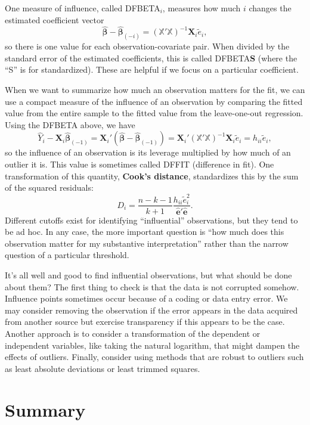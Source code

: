\documentclass[
  13pt,
  letterpaper,
  DIV=11,
  numbers=noendperiod]{scrreprt}
\newcommand{\mb}{\symbf}
\newcommand{\X}{\mb{X}}
\newcommand{\Xmat}{\mathbb{X}}
\newcommand{\bhat}{\widehat{\mb{\beta}}}
\theoremstyle{definition}
\theoremstyle{definition}
\theoremstyle{plain}
\theoremstyle{remark}
\begin{document}
One measure of influence, called DFBETA\(_i\), measures how much \(i\)
changes the estimated coefficient vector \[ 
\bhat - \bhat_{(-i)} = \left( \Xmat'\Xmat\right)^{-1}\X_i\widetilde{e}_i,
\] so there is one value for each observation-covariate pair. When
divided by the standard error of the estimated coefficients, this is
called DFBETA\textbf{S} (where the ``S'' is for standardized). These are
helpful if we focus on a particular coefficient.

When we want to summarize how much an observation matters for the fit,
we can use a compact measure of the influence of an observation by
comparing the fitted value from the entire sample to the fitted value
from the leave-one-out regression. Using the DFBETA above, we have \[ 
\widehat{Y}_i - \X_{i}\bhat_{(-1)} = \X_{i}'(\bhat -\bhat_{(-1)}) = \X_{i}'\left( \Xmat'\Xmat\right)^{-1}\X_i\widetilde{e}_i = h_{ii}\widetilde{e}_i,
\] so the influence of an observation is its leverage multiplied by how
much of an outlier it is. This value is sometimes called DFFIT
(difference in fit). One transformation of this quantity, \textbf{Cook's
distance}, standardizes this by the sum of the squared residuals: \[ 
D_i = \frac{n-k-1}{k+1}\frac{h_{ii}\widetilde{e}_{i}^{2}}{\widehat{\mb{e}}'\widehat{\mb{e}}}.
\] Different cutoffs exist for identifying ``influential'' observations,
but they tend to be ad hoc. In any case, the more important question is
``how much does this observation matter for my substantive
interpretation'' rather than the narrow question of a particular
threshold.

It's all well and good to find influential observations, but what should
be done about them? The first thing to check is that the data is not
corrupted somehow. Influence points sometimes occur because of a coding
or data entry error. We may consider removing the observation if the
error appears in the data acquired from another source but exercise
transparency if this appears to be the case. Another approach is to
consider a transformation of the dependent or independent variables,
like taking the natural logarithm, that might dampen the effects of
outliers. Finally, consider using methods that are robust to outliers
such as least absolute deviations or least trimmed squares.

\section{Summary}\label{summary-5}
\end{document}
